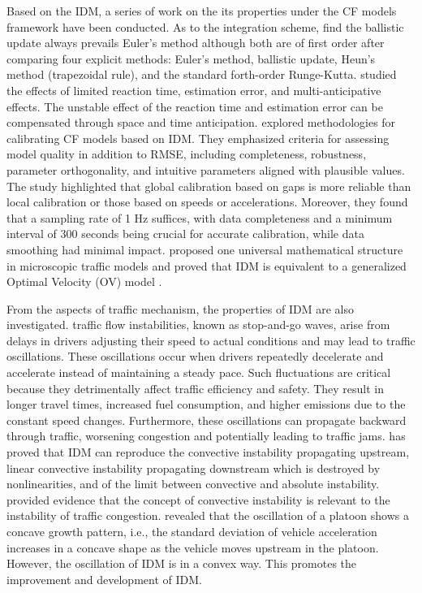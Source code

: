 \documentclass[a4paper,fleqn]{cas-sc}
\begin{document}
Based on the IDM, a series of work on the its properties under the CF models framework have been conducted. As to the integration scheme, \cite{treiberComparingNumericalIntegrationSchemes2015} find the ballistic update always prevails Euler’s method although both are of first order after comparing four explicit methods: Euler’s method, ballistic update, Heun’s method (trapezoidal rule), and the standard forth-order Runge-Kutta. \cite{treiber_delays_2006} studied the effects of limited reaction time, estimation error, and multi-anticipative effects. The unstable effect of the reaction time and estimation error can be compensated through space and time anticipation.\cite{treiberMicroscopicCalibrationValidationCarFollowing2013} explored methodologies for calibrating CF models based on IDM. They emphasized criteria for assessing model quality in addition to RMSE, including completeness, robustness, parameter orthogonality, and intuitive parameters aligned with plausible values. The study highlighted that global calibration based on gaps is more reliable than local calibration or those based on speeds or accelerations. Moreover, they found that a sampling rate of 1 Hz suffices, with data completeness and a minimum interval of 300 seconds being crucial for accurate calibration, while data smoothing had minimal impact. \cite{yangClassificationUnificationMicroscopicDeterministic2015a} proposed one universal mathematical structure in microscopic traffic models and proved that IDM is equivalent to a generalized Optimal Velocity (OV) model . 

From the aspects of traffic mechanism, the properties of IDM are also investigated. traffic flow instabilities, known as stop-and-go waves, arise from delays in drivers adjusting their speed to actual conditions and may lead to traffic oscillations. These oscillations occur when drivers repeatedly decelerate and accelerate instead of maintaining a steady pace. Such fluctuations are critical because they detrimentally affect traffic efficiency and safety. They result in longer travel times, increased fuel consumption, and higher emissions due to the constant speed changes. Furthermore, these oscillations can propagate backward through traffic, worsening congestion and potentially leading to traffic jams. \cite{treiberTrafficFlowDynamics2013} has proved that IDM can reproduce the convective instability propagating upstream, linear convective instability propagating downstream which is destroyed by nonlinearities, and of the limit between convective and absolute instability. \cite{treiberEvidenceConvectiveInstabilityCongested2011} provided evidence that the concept of convective instability is relevant to the instability of traffic congestion. \cite{jiangTrafficExperimentRevealsNature2014a} revealed that the oscillation of a platoon shows a concave growth pattern, i.e., the standard deviation of vehicle acceleration increases in a concave shape as the vehicle moves upstream in the platoon. However, the oscillation of IDM is in a convex way. This promotes the improvement and development of IDM.
\end{document}
